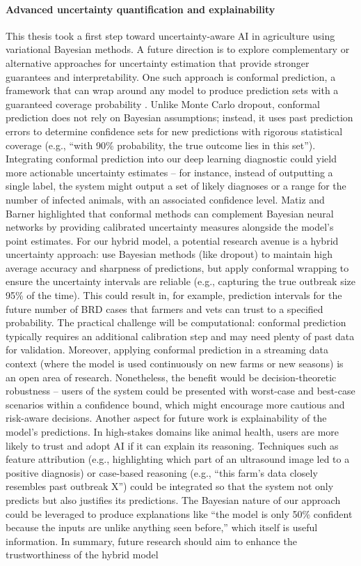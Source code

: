 \paragraph{Advanced uncertainty quantification and explainability} This thesis took a first step toward uncertainty-aware AI in agriculture using variational Bayesian methods. A future direction is to explore complementary or alternative approaches for uncertainty estimation that provide stronger guarantees and interpretability. One such approach is conformal prediction, a framework that can wrap around any model to produce prediction sets with a guaranteed coverage probability \cite{Angelopoulos2021}. Unlike Monte Carlo dropout, conformal prediction does not rely on Bayesian assumptions; instead, it uses past prediction errors to determine confidence sets for new predictions with rigorous statistical coverage (e.g., “with 90\% probability, the true outcome lies in this set”). Integrating conformal prediction into our deep learning diagnostic could yield more actionable uncertainty estimates – for instance, instead of outputting a single label, the system might output a set of likely diagnoses or a range for the number of infected animals, with an associated confidence level. Matiz and Barner \cite{matiz2020conformal} highlighted that conformal methods can complement Bayesian neural networks by providing calibrated uncertainty measures alongside the model’s point estimates. For our hybrid model, a potential research avenue is a hybrid uncertainty approach: use Bayesian methods (like dropout) to maintain high average accuracy and sharpness of predictions, but apply conformal wrapping to ensure the uncertainty intervals are reliable (e.g., capturing the true outbreak size 95\% of the time). This could result in, for example, prediction intervals for the future number of BRD cases that farmers and vets can trust to a specified probability. The practical challenge will be computational: conformal prediction typically requires an additional calibration step and may need plenty of past data for validation. Moreover, applying conformal prediction in a streaming data context (where the model is used continuously on new farms or new seasons) is an open area of research. Nonetheless, the benefit would be decision-theoretic robustness – users of the system could be presented with worst-case and best-case scenarios within a confidence bound, which might encourage more cautious and risk-aware decisions. Another aspect for future work is explainability of the model’s predictions. In high-stakes domains like animal health, users are more likely to trust and adopt AI if it can explain its reasoning. Techniques such as feature attribution (e.g., highlighting which part of an ultrasound image led to a positive diagnosis) or case-based reasoning (e.g., “this farm’s data closely resembles past outbreak X”) could be integrated so that the system not only predicts but also justifies its predictions. The Bayesian nature of our approach could be leveraged to produce explanations like “the model is only 50\% confident because the inputs are unlike anything seen before,” which itself is useful information. In summary, future research should aim to enhance the trustworthiness of the hybrid model 